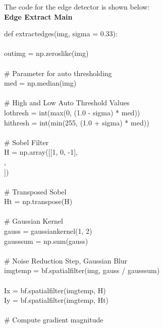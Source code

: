 \documentclass{article}
\begin{document}
	\noindent The code for the edge detector is shown below:\\
	
	\noindent \textbf{Edge Extract Main}
	
	\smallskip
	
	\noindent def extract\textunderscore edges(img, sigma = 0.33):\\
	\\
	\indent out\textunderscore img = np.zeros\textunderscore like(img)\\
	\\
	\indent \# Parameter for auto thresholding\\
	\indent med = np.median(img)\\
	\\
	\indent \# High and Low Auto Threshold Values\\
	\indent lo\textunderscore thresh = int(max(0, (1.0 - sigma) * med))\\
	\indent hi\textunderscore thresh = int(min(255, (1.0 + sigma) * med))\\
	\\
	\indent \# Sobel Filter\\
	\indent H = np.array([[1, 0, -1],\\
	\indent \indent [2, 0, -2],\\
	\indent \indent [1, 0, -1]])\\
	\\
	\indent \# Transposed Sobel\\
	\indent H\textunderscore t = np.transpose(H)\\
	\\
	\indent \# Gaussian Kernel\\
	\indent gauss = gaussian\textunderscore kernel(1, 2)\\
	\indent gauss\textunderscore sum = np.sum(gauss)\\
	\\
	\indent \# Noise Reduction Step, Gaussian Blur\\
	\indent img\textunderscore temp = bf.spatial\textunderscore filter(img, gauss / gauss\textunderscore sum)\\
	\\
	\indent I\textunderscore x = bf.spatial\textunderscore filter(img\textunderscore temp, H)\\
	\indent I\textunderscore y = bf.spatial\textunderscore filter(img\textunderscore temp, H\textunderscore t)\\
	\\
	\indent \# Compute gradient magnitude\\
\end{document}
